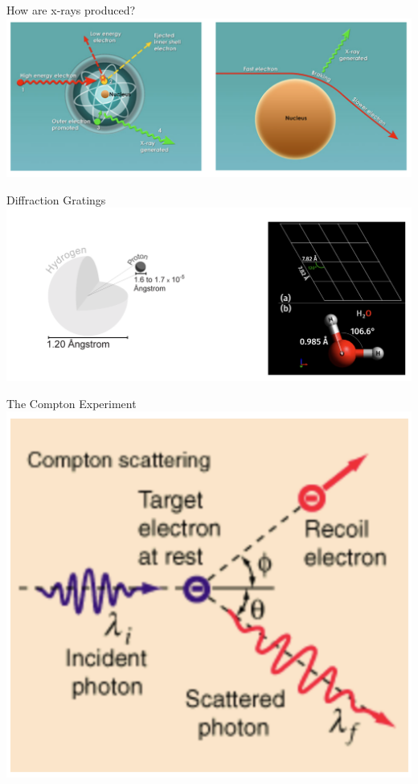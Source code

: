 \begin{frame}{How are x-rays produced?}
\small
\includegraphics[scale=0.3]{xrayprod}

\end{frame}


\begin{frame}{Diffraction Gratings}
\small
\includegraphics[scale=0.3]{grating}


\end{frame}




\begin{frame}{The Compton Experiment}
\small
\includegraphics[scale=0.3]{compton1}


\end{frame}

